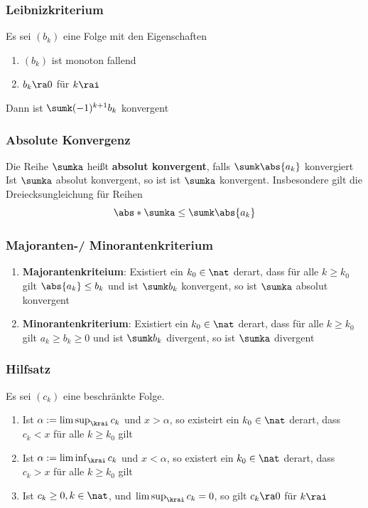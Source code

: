 \documentclass{kit}
\begin{document}
    \subsubsection{Leibnizkriterium}
      Es sei $(b_k)$ eine Folge mit den Eigenschaften
      \begin{enumerate}
        \item $(b_k)$ ist monoton fallend
        \item $b_k\ra0$ für $k\rai$
      \end{enumerate}
      Dann ist $\sumk(-1)^{k+1}b_k$ konvergent
    \subsubsection{Absolute Konvergenz}
      Die Reihe $\sumka$ heißt \textbf{absolut konvergent}, falls $\sumk\abs{a_k}$ konvergiert\\
      Ist $\sumka$ absolut konvergent, so ist ist $\sumka$ konvergent. Insbesondere gilt die Dreiecksungleichung für Reihen
      $$\abs*{\sumka}\le\sumk\abs{a_k}$$
    \subsubsection{Majoranten-/ Minorantenkriterium}
      \begin{enumerate}
        \item \textbf{Majorantenkriteium}: Existiert ein $k_0\in\nat$ derart, dass für alle $k\ge k_0$ gilt $\abs{a_k}\le b_k$ und ist $\sumk b_k$ konvergent, so ist $\sumka$ absolut konvergent
        \item \textbf{Minorantenkriterium}: Existiert ein $k_0\in\nat$ derart, dass für alle $k\ge k_0$ gilt $a_k\ge b_k\ge 0$ und ist $\sumk b_k$ divergent, so ist $\sumka$ divergent
      \end{enumerate}
    \subsubsection{Hilfsatz}
      Es sei $(c_k)$ eine beschränkte Folge.
      \begin{enumerate}
        \item Ist $\alpha:=\limsup_\krai c_k$ und $x>\alpha$, so existeirt ein $k_0\in\nat$ derart, dass $c_k<x$ für alle $k\ge k_0$ gilt
        \item Ist $\alpha:=\liminf_\krai c_k$ und $x<\alpha$, so existert ein $k_0\in\nat$ derart, dass $c_k>x$ für alle $k\ge k_0$ gilt
        \item Ist $c_k\ge0,k\in\nat$, und $\limsup_\krai c_k=0$, so gilt $c_k\ra0$ für $k\rai$
      \end{enumerate}
\end{document}
